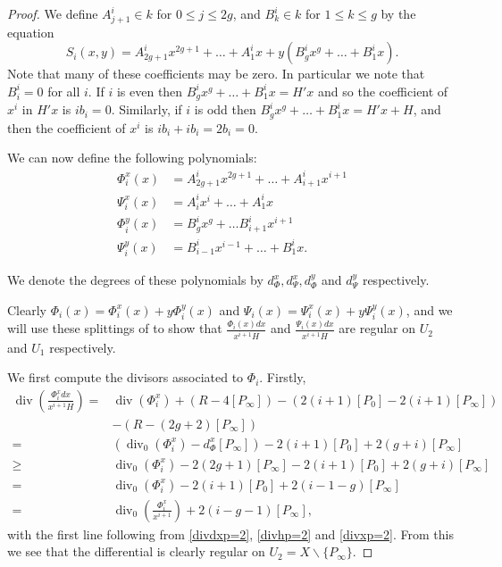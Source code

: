 \documentclass[draft, 11pt]{article} %
\theoremstyle{plain}
\theoremstyle{remark}
\DeclareMathOperator{\di}{div}
\begin{document}
\begin{proof}
We define $A^i_{j+1} \in k$ for $0 \leq j \leq 2g$, and $B_k^i \in k$ for $1\leq k \leq g$ by the equation
\[
S_i(x,y) = A_{2g+1}^ix^{2g+1} + \ldots + A^i_1 x + y(B_g^i x^g + \ldots + B_1^i x).
\]
Note that many of these coefficients may be zero.
In particular we note that $B_i^i = 0$ for all $i$.
If $i$ is even then $B_g^ix^g + \ldots + B_1^ix = H'x$ and so the coefficient of $x^i$ in $H'x$ is $ib_i = 0$.
Similarly, if $i$ is odd then $B_g^ix^g + \ldots + B_1^ix = H'x + H$, and then the coefficient of $x^i$ is $ib_i+ ib_i = 2b_i = 0$.


We can now define the following polynomials:
\begin{align*}
\Phi_i^x(x) & =  A^i_{2g+1}x^{2g+1} + \ldots + A^i_{i+1}x^{i+1} \\
\Psi_i^x(x) & =  A^i_ix^i + \ldots + A^i_1x \\
\Phi_i^y(x) & =  B_g^ix^g + \ldots B_{i+1}^ix^{i+1} \\
\Psi_i^y(x) & =  B_{i-1}^ix^{i-1} + \ldots + B_1^ix.
\end{align*}

We denote the degrees of these polynomials by $d_{\Phi}^x, d_{\Psi}^x, d_{\Phi}^y$ and $d_{\Psi}^y$ respectively.

Clearly $\Phi_i(x) = \Phi_i^x(x) + y\Phi_i^y(x)$ and $\Psi_i (x)= \Psi_i^x(x) + y\Psi_i^y(x)$, and we will use these splittings of to show that $\frac{ \Phi_i(x) dx}{x^{i+1}H}$ and $\frac{\Psi_i(x) dx}{x^{i+1}H}$ are regular on $U_2$ and $U_1$ respectively.

We first compute the divisors associated to $\Phi_i$.
Firstly,
\begin{align*}
\di \left( \frac{\Phi_i^x dx}{x^{i+1} H} \right)  = &  \di(\Phi_i^x) + (R - 4[P_\infty]) - (2(i+1)[P_0] - 2(i+1)[P_\infty])\\
& - (R - (2g+2) [P_\infty]) \\
 = & \left( \di_0(\Phi_i^x) -d_\Phi^x[P_\infty]\right) -2(i+1)[P_0] + 2(g+i)[P_\infty]\\
 \geq & \di_0(\Phi_i^x) - 2(2g+1)[P_\infty] - 2(i+1)[P_0] + 2(g+i)[P_\infty] \\
 = &  \di_0(\Phi_i^x) - 2(i+1)[P_0] + 2(i-1-g)[P_\infty] \\
 =  & \di_0 \left( \frac{\Phi_i^x}{x^{i+1}} \right) + 2(i-g-1)[P_\infty],
\end{align*}
with the first line following from \eqref{divdxp=2}, \eqref{divhp=2} and \eqref{divxp=2}.
From this we see that the differential is clearly regular on $U_2 = X \backslash \{P_\infty\}$.


\end{proof}
\end{document}
